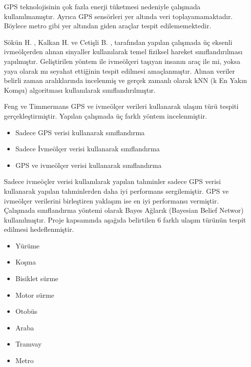 GPS teknolojisinin çok fazla enerji tüketmesi nedeniyle çalışmada kullanılmamıştır. Ayrıca GPS sensörleri yer altında veri toplayamamaktadır. Böylece metro gibi yer altından giden araçlar tespit edilememektedir.



Sökün H. , Kalkan H. ve Cetişli B. \cite{sokun2012classification}, tarafından yapılan çalışmada üç eksenli ivmeölçerden alınan sinyaller kullanılarak temel fiziksel hareket sınıflandırılması yapılmıştır. Geliştirilen yöntem ile ivmeölçeri taşıyan insanın araç ile mi, yoksa yaya olarak mı seyahat ettiğinin tespit edilmesi amaçlanmıştır. Alınan veriler belirli zaman aralıklarında incelenmiş ve gerçek zamanlı olarak kNN (k En Yakın Komşu) algoritması kullanılarak sınıflandırılmıştır.


Feng ve Timmermans \cite{feng2013transportation} GPS ve ivmeölçer verileri kullanarak ulaşım türü tespiti gerçekleştirmiştir. Yapılan çalışmada üç farklı yöntem incelenmiştir.
\begin{itemize}
  \item Sadece GPS verisi kullanarak sınıflandırma
  \item Sadece İvmeölçer verisi kullanarak sınıflandırma
  \item GPS ve ivmeölçer verisi kullanarak sınıflandırma
\end{itemize}

Sadece ivmeöçler verisi kullanılarak yapılan tahminler sadece GPS verisi kullanarak yapılan tahminlerden daha iyi performans sergilemiştir. GPS ve ivmeölçer verilerini birleştiren yaklaşım ise en iyi performansı vermiştir. Çalışmada sınıflandırma yöntemi olarak Bayes Ağlarık (Bayesian Belief Networ) kullanılmıştır. Proje kapsamında aşağıda belirtilen 6 farklı ulaşım türünün tespit edilmesi hedeflenmiştir.
\begin{itemize}
  \item Yürüme
  \item Koşma
  \item Bisiklet sürme
  \item Motor sürme
  \item Otobüs
  \item Araba
  \item Tramvay
  \item Metro
\end{itemize}


